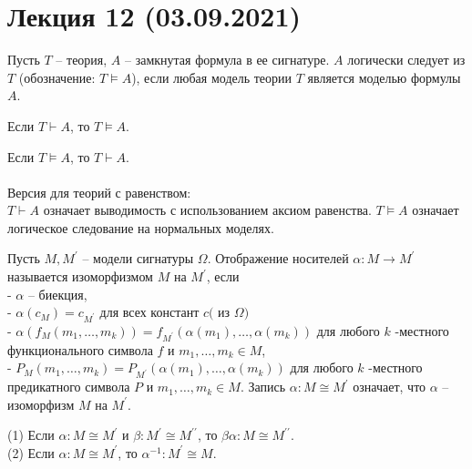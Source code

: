 \section{Лекция 12 (03.09.2021)}

\begin{defn}
Пусть $T$ -- теория, $A$ -- замкнутая формула в ее сигнатуре. $A$ логически следует из $T$ (обозначение: $T \vDash A$), если любая модель теории $T$ является моделью формулы $A$.
\end{defn}

\begin{theo}
Если $T \vdash A$, то $T \vDash A$.
\end{theo}
\begin{theo}
Если $T \vDash A$, то $T \vdash A$.\\
\\
Версия для теорий с равенством:\\
$T \vdash A$ означает выводимость с использованием аксиом равенства. $T \vDash A$ означает логическое следование на нормальных моделях.
\end{theo}

\begin{defn}
Пусть $M, M^{\prime}$ -- модели сигнатуры $\Omega$. Отображение носителей $\alpha: M \longrightarrow M^{\prime}$ называется изоморфизмом $M$ на $M^{\prime}$, если\\
- $\alpha$ -- биекция,\\
- $\alpha\left(c_{M}\right)=c_{M^{\prime}}$ для всех констант $c($ из $\Omega)$\\
- $\alpha\left(f_{M}\left(m_{1}, \ldots, m_{k}\right)\right)=f_{M^{\prime}}\left(\alpha\left(m_{1}\right), \ldots, \alpha\left(m_{k}\right)\right)$ для любого
$k$ -местного функционального символа $f$ и $m_{1}, \ldots, m_{k} \in M$,\\
- $P_{M}\left(m_{1}, \ldots, m_{k}\right)=P_{M^{\prime}}\left(\alpha\left(m_{1}\right), \ldots, \alpha\left(m_{k}\right)\right)$ для любого
$k$ -местного предикатного символа $P$ и $m_{1}, \ldots, m_{k} \in M$. Запись $\alpha: M \cong M^{\prime}$ означает, что $\alpha$ -- изоморфизм $M$ на $M^{\prime}$. 
\end{defn}

\begin{lem}
(1) Если $\alpha: M \cong M^{\prime}$ и $\beta: M^{\prime} \cong M^{\prime \prime}$, то $\beta \alpha: M \cong M^{\prime \prime}$.\\
(2) Если $\alpha: M \cong M^{\prime}$, то $\alpha^{-1}: M^{\prime} \cong M$.
\end{lem}

